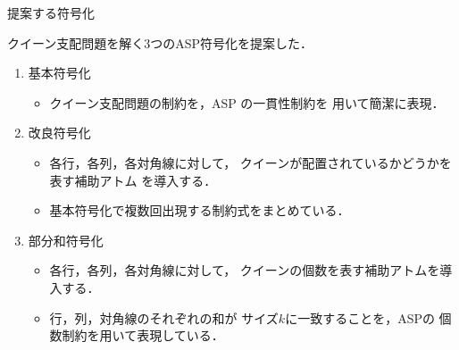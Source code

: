\documentclass[dvipdfmx,10pt]{beamer}
\begin{document}
%
%

\begin{frame}{提案する符号化}
 \begin{block}{}\centering
   クイーン支配問題を解く3つのASP符号化を提案した．
 \end{block}
 \begin{enumerate}
   \item \alert{基本符号化}
   \begin{itemize}
     \item クイーン支配問題の制約を，ASP の一貫性制約を
      用いて簡潔に表現．
   \end{itemize}
   \item \alert{改良符号化}
   \begin{itemize}
      \item 各行，各列，各対角線に対して，
        クイーンが配置されているかどうかを表す補助アトム
        を導入する．
      \item 基本符号化で複数回出現する制約式をまとめている．
   \end{itemize}
   \item \alert{部分和符号化}
   \begin{itemize}
      \item 各行，各列，各対角線に対して，
        クイーンの個数を表す補助アトムを導入する．
      \item 行，列，対角線のそれぞれの和が
        サイズ$k$に一致することを，ASPの
        個数制約を用いて表現している．
   \end{itemize}
 \end{enumerate}

\end{frame}
\end{document}
